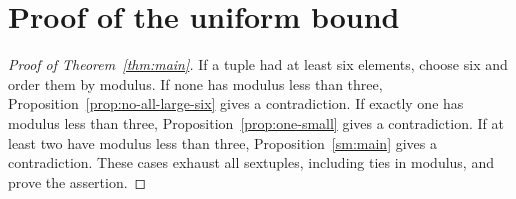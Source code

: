 \documentclass[12pt]{article}
\numberwithin{equation}{section}
\begin{document}
\section{Proof of the uniform bound}

\begin{proof}[Proof of Theorem~\ref{thm:main}]
If a tuple had at least six elements, choose six and order them by
modulus. If none has modulus less than three, Proposition~\ref{prop:no-all-large-six}
gives a contradiction. If exactly one has modulus less than three,
Proposition~\ref{prop:one-small} gives a contradiction. If at least
two have modulus less than three, Proposition~\ref{sm:main} gives a
contradiction. These cases exhaust all sextuples, including ties in
modulus, and prove the assertion.
\end{proof}
\end{document}
